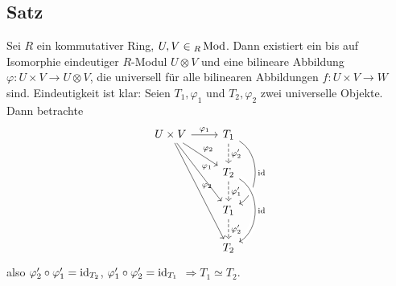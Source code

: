 \subsection[Satz: Universelle Eigenschaft des Tensorproduktes]{Satz} %
\label{sub:31}
Sei $R$ ein kommutativer Ring, $U,V \in {_R \operatorname{Mod}}$. Dann existiert ein bis auf Isomorphie eindeutiger $R$-Modul $U \otimes V$ und eine bilineare Abbildung 
$\varphi : U \times V \to U \otimes V$, die universell für alle bilinearen Abbildungen $f : U \times V \to W$ sind.
Eindeutigkeit ist klar: Seien $T_1, \varphi_1$ und $T_2, \varphi_2$ zwei universelle Objekte. Dann betrachte
\[
	\begin{tikzcd}
		U \times V \rar{\varphi_1} \drar{\varphi_2} \arrow{ddr}{\varphi_1} \arrow{dddr}{\varphi_2}& T_1  \dar[dashed]{\varphi_2'} \arrow[bend left = 60]{dd}{\id}	\\
		& T_2 \dar[dashed]{\varphi_1'}  \arrow[bend left = 60, crossing over]{dd}{\id}\\
		& T_1 \dar[dashed]{\varphi_2'} \\
		& T_2
	\end{tikzcd}
\]
also $\varphi_2' \circ \varphi_1' = \operatorname{id}_{T_2}$, $\varphi_1' \circ \varphi_2' = \operatorname{id}_{T_1}$ $\Rightarrow T_1 \simeq T_2$.

